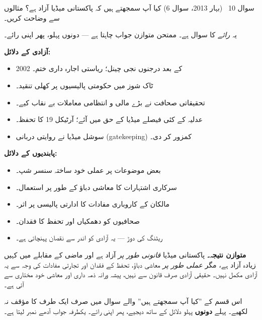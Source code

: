 \begin{sawal}{سوال \textenglish{10} \ \textnormal{\small(بہار \textenglish{2013}، سوال \textenglish{6})}}
کیا آپ سمجھتے ہیں کہ پاکستانی میڈیا آزاد ہے؟ مثالوں سے وضاحت کریں۔
\end{sawal}

\begin{hal}
یہ \emph{رائے} کا سوال ہے۔ ممتحن متوازن جواب چاہتا ہے --- دونوں پہلو، پھر
اپنی رائے۔

\medskip
\textbf{آزادی کے دلائل:}
\begin{itemize}\setlength{\itemsep}{1pt}
  \item \textenglish{2002} کے بعد درجنوں نجی چینل؛ ریاستی اجارہ داری ختم۔
  \item ٹاک شوز میں حکومتی پالیسیوں پر کھلی تنقید۔
  \item تحقیقاتی صحافت نے بڑے مالی و انتظامی معاملات بے نقاب کیے۔
  \item عدلیہ کے کئی فیصلے میڈیا کے حق میں آئے؛ آرٹیکل \textenglish{19}
        کا تحفظ۔
  \item سوشل میڈیا نے روایتی دربانی (\textenglish{gatekeeping}) کمزور کر دی۔
\end{itemize}

\textbf{پابندیوں کے دلائل:}
\begin{itemize}\setlength{\itemsep}{1pt}
  \item بعض موضوعات پر عملی خود ساختہ سنسر شپ۔
  \item سرکاری اشتہارات کا معاشی دباؤ کے طور پر استعمال۔
  \item مالکان کے کاروباری مفادات کا ادارتی پالیسی پر اثر۔
  \item صحافیوں کو دھمکیاں اور تحفظ کا فقدان۔
  \item ریٹنگ کی دوڑ --- یہ آزادی کو اندر سے نقصان پہنچاتی ہے۔
\end{itemize}

\medskip
\textbf{متوازن نتیجہ۔} پاکستانی میڈیا \emph{قانونی طور پر} آزاد ہے اور ماضی کے
مقابلے میں کہیں زیادہ آزاد ہے، مگر \emph{عملی طور پر} معاشی دباؤ، تحفظ کے فقدان
اور تجارتی مفادات کی وجہ سے یہ آزادی مکمل نہیں۔ حقیقی آزادی صرف قانون سے نہیں،
پیشہ ورانہ ذمہ داری اور معاشی خود مختاری سے آتی ہے۔

\end{hal}

\begin{ghalti}
اس قسم کے ''کیا آپ سمجھتے ہیں'' والے سوال میں صرف ایک طرف کا مؤقف نہ لکھیے۔
پہلے \textbf{دونوں} پہلو دلائل کے ساتھ دیجیے، پھر اپنی رائے۔ یکطرفہ جواب آدھے
نمبر لیتا ہے۔
\end{ghalti}

